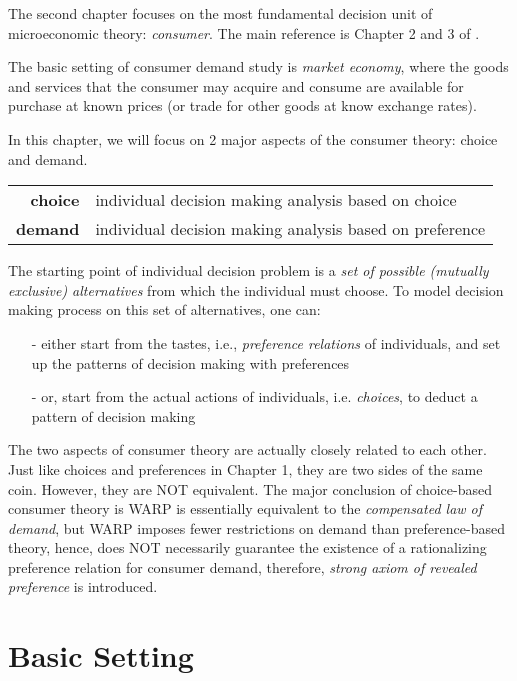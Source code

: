 \minitoc

\vspace{0.5cm}
The second chapter focuses on the most fundamental decision unit of microeconomic theory: \textit{consumer}. The main reference is Chapter 2 and 3 of \citet{mas1995microeconomic}.

The basic setting of consumer demand study is \textit{market economy}, where the goods and services that the consumer may acquire and consume are available for purchase at known prices (or trade for other goods at know exchange rates).

In this chapter, we will focus on 2 major aspects of the consumer theory: choice and demand.
\begin{center}
    \begin{tabular}{rl}
    \hline
    \textbf{choice} & individual decision making analysis based on choice\\ 
    \textbf{demand} & individual decision making analysis based on preference \\ 
    \hline
    \end{tabular}
\end{center}

The starting point of individual decision problem is a \textit{set of possible (mutually exclusive) alternatives} from which the individual must choose. To model decision making process
on this set of alternatives, one can:
\begin{enumerate}
    \item[-] either start from the tastes, i.e., \textit{preference relations} of individuals, and set up the patterns of decision making with preferences
    \item[-] or, start from the actual actions of individuals, i.e. \textit{choices}, to deduct a pattern of decision making
\end{enumerate}

The two aspects of consumer theory are actually closely related to each other. Just like choices and preferences in Chapter 1, they are two sides of the same coin. However, they are NOT equivalent.
The major conclusion of choice-based consumer theory is WARP is essentially equivalent to the \textit{compensated law of demand}, but WARP imposes fewer restrictions on demand than preference-based theory,
hence, does NOT necessarily guarantee the existence of a rationalizing preference relation for consumer demand, therefore, \textit{strong axiom of revealed preference} is introduced.

\section{Basic Setting}\label{chap2:sec1}


